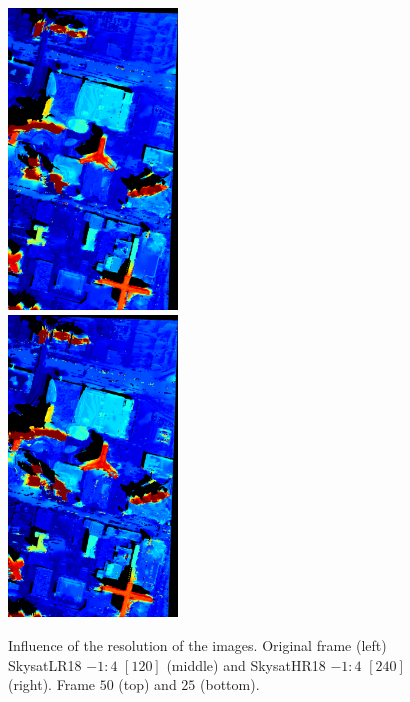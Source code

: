 \documentclass{article}
\theoremstyle{definition}
\begin{document}
\begin{figure}[ht]
 \centering
 \includegraphics[height=8cm]{images/SkysatHR18_240/1521744514157_dmap_050.png}\\
 \vspace{-0.11em}
 \includegraphics[height=8cm]{images/SkysatHR18_240/1521744514157_dmap_025.png}
 \caption{Influence of the resolution of the images. Original frame (left) SkysatLR18 $-1:4$ $[120]$ (middle) and SkysatHR18 $-1:4$ $[240]$ (right). Frame $50$ (top) and $25$ (bottom).}
 \label{fig:influenceres}
\end{figure}
\end{document}
